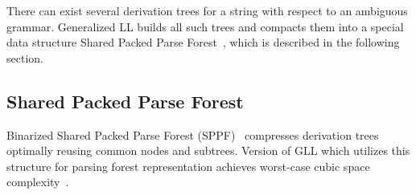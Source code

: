 %
%
%

There can exist several derivation trees for a string with respect to an ambiguous grammar.
Generalized LL builds all such trees and compacts them into a special data structure Shared Packed Parse Forest~\cite{SPPF}, which is described in the following section.

\subsection{Shared Packed Parse Forest}

Binarized Shared Packed Parse Forest (SPPF)~\cite{brnglr} compresses derivation trees optimally reusing common nodes and subtrees.
Version of GLL which utilizes this structure for parsing forest representation achieves worst-case cubic space complexity~\cite{gllParsingTree}.

